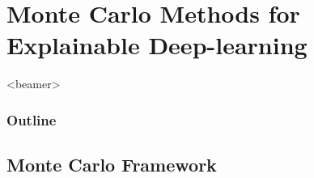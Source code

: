 \documentclass{beamer}
\begin{document}

\section{Monte Carlo Methods for Explainable Deep-learning}

\begin{frame}<beamer>
\frametitle{Outline}
\tableofcontents[currentsection]
\end{frame}

\subsection{Monte Carlo Framework}




\end{document}

